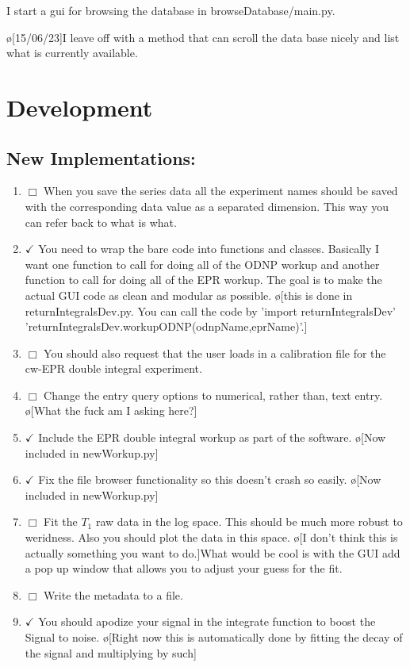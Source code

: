 \documentclass[10pt]{book}
\begin{document}
I start a gui for browsing the database in browseDatabase/main.py.

\o[15/06/23]{I leave off with a method that can scroll the data base nicely and list what is currently available.}



\chapter{Development}
\section{New Implementations:}
\begin{enumerate}
    \item $\Box$ When you save the series data all the experiment names should be saved with the corresponding data value as a separated dimension. This way you can refer back to what is what.
    \item $\checkmark$ You need to wrap the bare code into functions and classes. Basically I want one function to call for doing all of the ODNP workup and another function to call for doing all of the EPR workup. The goal is to make the actual GUI code as clean and modular as possible. \o[this is done in returnIntegralsDev.py. You can call the code by 'import returnIntegralsDev' 'returnIntegralsDev.workupODNP(odnpName,eprName)'.]{}
    \item $\Box$ You should also request that the user loads in a calibration file for the cw-EPR double integral experiment.
    \item $\Box$ Change the entry query options to numerical, rather than, text entry. \o[What the fuck am I asking here?]{}
    \item $\checkmark$ Include the EPR double integral workup as part of the software. \o[Now included in newWorkup.py]{}
    \item $\checkmark$ Fix the file browser functionality so this doesn't crash so easily. \o[Now included in newWorkup.py]{}
    \item $\Box$ Fit the $T_1$ raw data in the log space. This should be much more robust to weridness. Also you should plot the data in this space. \o[I don't think this is actually something you want to do.]{What would be cool is with the GUI add a pop up window that allows you to adjust your guess for the fit.}
    \item $\Box$ Write the metadata to a file.
    \item $\checkmark$ You should apodize your signal in the integrate function to boost the Signal to noise. \o[Right now this is automatically done by fitting the decay of the signal and multiplying by such]{}

\end{enumerate}
\end{document}
